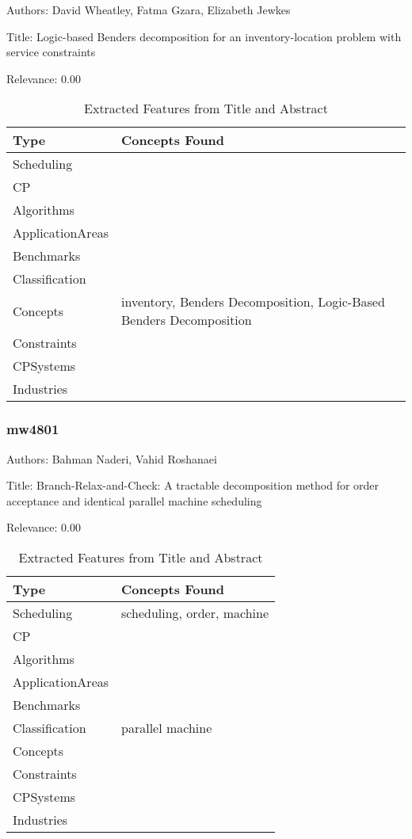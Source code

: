 Authors: David Wheatley, Fatma Gzara, Elizabeth Jewkes

Title: Logic-based Benders decomposition for an inventory-location problem with service constraints

Relevance:  0.00

{\scriptsize
\begin{longtable}{p{2cm}p{20cm}}
\caption{Extracted Features from Title and Abstract}\\ \toprule
Type & Concepts Found\\ \midrule
\endhead
\bottomrule
\endfoot
Scheduling & \\ 
CP & \\ 
Algorithms & \\ 
ApplicationAreas & \\ 
Benchmarks & \\ 
Classification & \\ 
Concepts & inventory, Benders Decomposition, Logic-Based Benders Decomposition\\ 
Constraints & \\ 
CPSystems & \\ 
Industries & \\ 
\end{longtable}
}



\subsubsection{mw4801}
\label{mw:mw4801}

Authors: Bahman Naderi, Vahid Roshanaei

Title: Branch-Relax-and-Check: A tractable decomposition method for order acceptance and identical parallel machine scheduling

Relevance:  0.00

{\scriptsize
\begin{longtable}{p{2cm}p{20cm}}
\caption{Extracted Features from Title and Abstract}\\ \toprule
Type & Concepts Found\\ \midrule
\endhead
\bottomrule
\endfoot
Scheduling & scheduling, order, machine\\ 
CP & \\ 
Algorithms & \\ 
ApplicationAreas & \\ 
Benchmarks & \\ 
Classification & parallel machine\\ 
Concepts & \\ 
Constraints & \\ 
CPSystems & \\ 
Industries & \\ 
\end{longtable}
}



